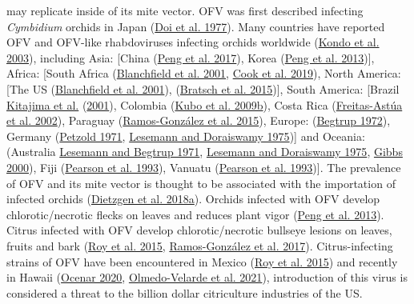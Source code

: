 \documentclass[12pt,final,CPage]{ufthesis}
\begin{document}
{may replicate inside of its mite vector. OFV was first described infecting \emph{Cymbidium} orchids in Japan (\protect\hyperlink{ref-Doi1977}{Doi et al. 1977}). Many countries have reported OFV and OFV-like rhabdoviruses infecting orchids worldwide (\protect\hyperlink{ref-Kondo2003}{Kondo et al. 2003}), including Asia: {[}China (\protect\hyperlink{ref-Peng2017}{Peng et al. 2017}), Korea (\protect\hyperlink{ref-Peng2013}{Peng et al. 2013}){]}, Africa: {[}South Africa (\protect\hyperlink{ref-Blanchfield2001}{Blanchfield et al. 2001}, \protect\hyperlink{ref-Cook2019}{Cook et al. 2019}), North America: {[}The US (\protect\hyperlink{ref-Blanchfield2001}{Blanchfield et al. 2001}), (\protect\hyperlink{ref-Bratsch2015}{Bratsch et al. 2015}){]}, South America: {[}Brazil \protect\hyperlink{ref-Kitajima2001}{Kitajima et al.} (\protect\hyperlink{ref-Kitajima2001}{2001}), Colombia (\protect\hyperlink{ref-Kubo2009}{Kubo et al. 2009b}), Costa Rica (\protect\hyperlink{ref-FreitasAstua2002}{Freitas-Astúa et al. 2002}), Paraguay (\protect\hyperlink{ref-RamosGonzalez2015}{Ramos-González et al. 2015}), Europe: (\protect\hyperlink{ref-Begtrup1972}{Begtrup 1972}), Germany (\protect\hyperlink{ref-Petzold1971}{Petzold 1971}, \protect\hyperlink{ref-Lesemann1975}{Lesemann and Doraiswamy 1975}){]} and Oceania: (Australia \protect\hyperlink{ref-Lesemann1971}{Lesemann and Begtrup 1971}, \protect\hyperlink{ref-Lesemann1975}{Lesemann and Doraiswamy 1975}, \protect\hyperlink{ref-Gibbs2000}{Gibbs 2000}), Fiji (\protect\hyperlink{ref-Pearson1993}{Pearson et al. 1993}), Vanuatu (\protect\hyperlink{ref-Pearson1993}{Pearson et al. 1993}){]}. The prevalence of OFV and its mite vector is thought to be associated with the importation of infected orchids (\protect\hyperlink{ref-Dietzgen2018}{Dietzgen et al. 2018a}). Orchids infected with OFV develop chlorotic/necrotic flecks on leaves and reduces plant vigor (\protect\hyperlink{ref-Peng2013}{Peng et al. 2013}). Citrus infected with OFV develop chlorotic/necrotic bullseye lesions on leaves, fruits and bark (\protect\hyperlink{ref-Roy2015}{Roy et al. 2015}, \protect\hyperlink{ref-RamosGonzalez2017}{Ramos-González et al. 2017}). Citrus-infecting strains of OFV have been encountered in Mexico (\protect\hyperlink{ref-Roy2015}{Roy et al. 2015}) and recently in Hawaii (\protect\hyperlink{ref-Ocenar2020}{Ocenar 2020}, \protect\hyperlink{ref-Velarde2021}{Olmedo-Velarde et al. 2021}), introduction of this virus is considered a threat to the billion dollar citriculture industries of the US.
  \begin{figure}


\end{figure}}
\end{document}
